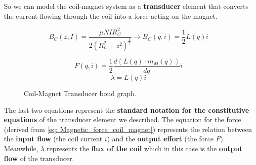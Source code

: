 \pagebreak

\begin{samepage}
    So we can model the coil-magnet system as a \textbf{transducer} element that converts the current flowing through the coil into a force acting on the magnet.
    \nopagebreak

    \begin{equation*}
        B_C(z, I) = \frac{\mu N I R_C^2}{2(R_C^2+z^2)^\frac{3}{2}} \rightarrow B_C(q, i) = \frac{1}{2} L(q) i
    \end{equation*}
    \nopagebreak

    \begin{figure}[H]
        \centering
        \resizebox{.7\linewidth}{!}{
            
        }
        
        \begin{equation*}
            F(q, i) = \frac{1}{2} \frac{d \left(L(q) \cdot m_M(q) \right)}{dq} i
        \end{equation*} 
        \begin{equation*}
            \lambda = L(q) i
        \end{equation*}
        \caption{Coil-Magnet Transducer bond graph.}    
        \label{fig: Coil-Magnet_Transducer}
    \end{figure}
\end{samepage}

The last two equations represent the \textbf{standard notation for the constitutive equations} of the transducer element we described.
The equation for the force (derived from \ref{eq: Magnetic_force_coil_magnet}) represents the relation between the \textbf{input flow} (the coil current $i$) and the \textbf{output effort} (the force $F$).
Meanwhile, \textbf{$\lambda$} represents the \textbf{flux of the coil} which in this case is the \textbf{output flow} of the transducer.
